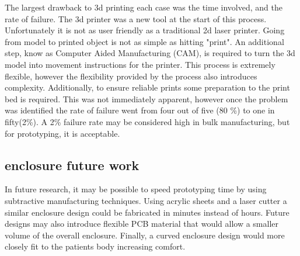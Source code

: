 The largest drawback to 3d printing each case was the time involved, and the rate of failure. The 3d printer was a new tool at the start of this process. Unfortunately it is not as user friendly as a traditional 2d laser printer. Going from model to printed object is not as simple as hitting "print". An additional step, know as Computer Aided Manufacturing (CAM), is required to turn the 3d model into movement instructions for the printer. This process is extremely flexible, however the flexibility provided by the process also introduces complexity. Additionally, to ensure reliable prints some preparation to the print bed is required. This was not immediately apparent, however once the problem was identified the rate of failure went from four out of five (80 \%) to one in fifty(2\%). A 2\% failure rate may be considered high in bulk manufacturing, but for prototyping, it is acceptable.

\subsection{enclosure future work}
In future research, it may be possible to speed prototyping time by using subtractive manufacturing techniques. Using acrylic sheets and a laser cutter a similar enclosure design could be fabricated in minutes instead of hours. Future designs may also introduce flexible PCB material that would allow a smaller volume of the overall enclosure. Finally, a curved enclosure design would more closely fit to the patients body increasing comfort.
